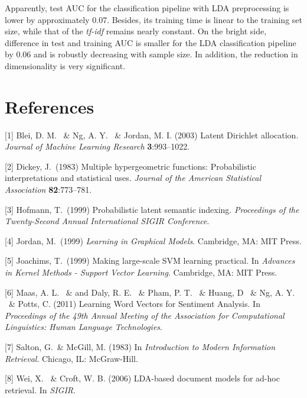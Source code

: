 \documentclass{article}
\begin{document}
Apparently, test AUC for the classification pipeline with LDA preprocessing is lower by approximately 0.07. Besides, its training time is linear to the training set size, while that of the \emph{tf-idf} remains nearly constant. On the bright side, difference in test and training AUC is smaller for the LDA classification pipeline by 0.06 and is robustly decreasing with sample size. In addition, the reduction in dimensionality is very significant.


\section*{References}
\medskip

\small

[1] Blei, D. M. \ \& Ng, A. Y. \ \& Jordan, M. I. (2003) Latent Dirichlet allocation. {\it Journal of Machine Learning Research} {\bf 3}:993–1022.

[2] Dickey, J.\ (1983) Multiple hypergeometric functions: Probabilistic interpretations and statistical uses. {\it Journal of the American Statistical Association} {\bf 82}:773–781.

[3] Hofmann, T.\ (1999) Probabilistic latent semantic indexing. {\it Proceedings of the Twenty-Second Annual International SIGIR Conference}.

[4] Jordan, M.\ (1999) {\it Learning in Graphical Models}. Cambridge, MA: MIT Press.

[5] Joachims, T.\ (1999) Making large-scale SVM learning practical. In {\it Advances in Kernel Methods - Support Vector Learning}. Cambridge, MA: MIT Press.

[6] Maas, A. L. \ \&  and  Daly, R. E. \ \&  Pham, P. T. \ \&  Huang, D \ \&  Ng, A. Y. \ \& Potts, C. (2011) Learning Word Vectors for Sentiment Analysis. In {\it Proceedings of the 49th Annual Meeting of the Association for Computational Linguistics: Human Language Technologies}.

[7] Salton, G.\ \& McGill, M. (1983) In {\it Introduction to Modern Information Retrieval}. Chicago, IL: McGraw-Hill.

[8] Wei, X. \ \& Croft, W. B. (2006) LDA-based document models for ad-hoc retrieval. In {\it SIGIR}.
\end{document}
